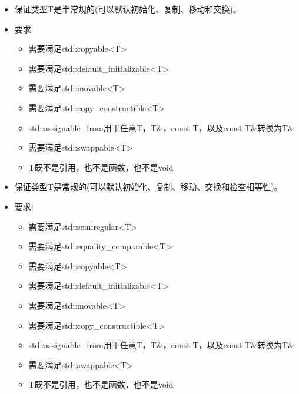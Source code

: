 \begin{itemize}
\item
保证类型T是半常规的(可以默认初始化、复制、移动和交换)。

\item
要求:
\begin{itemize}
\item
需要满足std::copyable<T>

\item
需要满足std::default\_initializable<T>

\item
需要满足std::movable<T>

\item
需要满足std::copy\_constructible<T>

\item
std::assignable\_from用于任意T，T\&，const T，以及const T\&转换为T\&

\item
需要满足std::swappable<T>

\item
T既不是引用，也不是函数，也不是void
\end{itemize}
\end{itemize}


\begin{itemize}
\item
保证类型T是常规的(可以默认初始化、复制、移动、交换和检查相等性)。

\item
要求:
\begin{itemize}
\item
需要满足std::semiregular<T>

\item
需要满足std::equality\_comparable<T>

\item
需要满足std::copyable<T>

\item
需要满足std::default\_initializable<T>

\item
需要满足std::movable<T>

\item
需要满足std::copy\_constructible<T>

\item
std::assignable\_from用于任意T，T\&，const T，以及const T\&转换为T\&

\item
需要满足std::swappable<T>

\item
T既不是引用，也不是函数，也不是void
\end{itemize}
\end{itemize}

